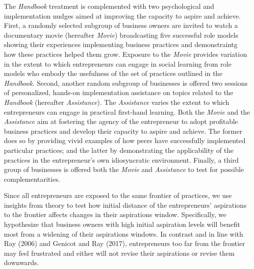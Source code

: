 \documentclass[11.5pt]{article}
\begin{document}
The \emph{Handbook} treatment is complemented with two psychological and implementation nudges aimed at improving the capacity to aspire and achieve. First, a randomly selected subgroup of business owners are invited to watch a documentary movie  (hereafter \emph{Movie}) broadcasting five successful role models showing their experiences implementing business practices and demonstraintg how these practices helped them grow. Exposure to the \emph{Movie} provides variation in the extent to which entrepreneurs can engage in social learning from role models who embody the usefulness of the set of practices outlined in the \emph{Handbook}. Second, another random subgroup of businesses is offered two sessions of personalized, hands-on implementation assistance on topics related to the \emph{Handbook} (hereafter \emph{Assistance}). The \emph{Assistance} varies the extent to which entrepreneurs can engage in practical first-hand learning. Both the \emph{Movie} and the \emph{Assistance} aim at fostering the agency of the entrepreneur to adopt profitable business practices and develop their capacity to aspire and achieve. The former does so by providing vivid examples of how peers have successfully implemented particular practices; and the latter by demonstrating the applicability of the practices in the entrepreneur's own idiosyncratic environment. Finally, a third group of businesses is offered both the \emph{Movie} and \emph{Assistance} to test for possible complementarities. 

Since all entrepreneurs are exposed to the same frontier of practices, we use insights from theory to test how initial distance of the entrepreneurs' aspirations to the frontier affects changes in their aspirations window. Specifically, we hypothesize that business owners with high initial aspiration levels will benefit most from a widening of their aspirations windows. In contrast and in line with Ray (2006) and Genicot and Ray (2017), entrepreneurs too far from the frontier may feel frustrated and either will not revise their aspirations or revise them downwards. 
\end{document}
